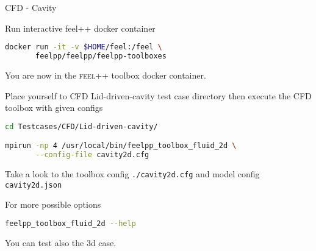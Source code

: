 


\begin{frame}{CFD - Cavity}

Run  interactive feel++ docker container

\begin{lstlisting}[language=Bash,mathescape=false,emph={docker}]
docker run -it -v $HOME/feel:/feel \
       feelpp/feelpp/feelpp-toolboxes
\end{lstlisting}

You are now in the \textsc{feel++} toolbox docker container.

Place yourself to CFD Lid-driven-cavity test case directory then execute the
CFD toolbox with given configs

\begin{lstlisting}[language=Bash,mathescape=false, emph={feelpp_toolbox_fluid_2d}]
cd Testcases/CFD/Lid-driven-cavity/

mpirun -np 4 /usr/local/bin/feelpp_toolbox_fluid_2d \
       --config-file cavity2d.cfg
\end{lstlisting}

Take a look to the toolbox config \lstinline{./cavity2d.cfg} and model config
\lstinline{cavity2d.json}

For more possible options
\begin{lstlisting}[language=Bash,mathescape=false, emph={feelpp_toolbox_fluid_2d}]
feelpp_toolbox_fluid_2d --help
\end{lstlisting}

You can test also the 3d case.

\end{frame}



%
%
%
%
%
%
%
%

